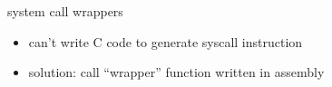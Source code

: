 \begin{frame}{system call wrappers}
    \begin{itemize}
    \item can't write C code to generate syscall instruction
    \item solution: call ``wrapper'' function written in assembly
    \end{itemize}
\end{frame}
